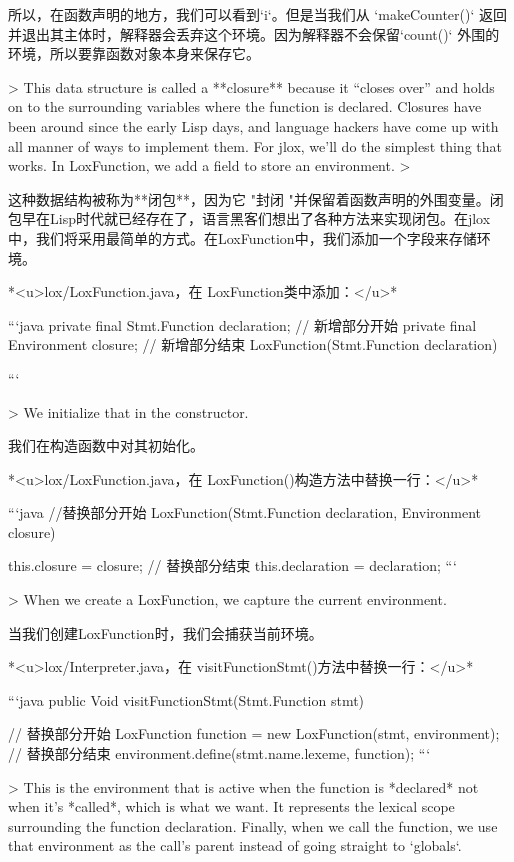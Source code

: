 \documentclass[cn,11pt,chinese]{elegantbook}
\begin{document}
{{{{{{{所以，在函数声明的地方，我们可以看到`i`。但是当我们从 `makeCounter()` 返回并退出其主体时，解释器会丢弃这个环境。因为解释器不会保留`count()` 外围的环境，所以要靠函数对象本身来保存它。

> This data structure is called a **closure** because it “closes over” and holds on to the surrounding variables where the function is declared. Closures have been around since the early Lisp days, and language hackers have come up with all manner of ways to implement them. For jlox, we’ll do the simplest thing that works. In LoxFunction, we add a field to store an environment.
>

这种数据结构被称为**闭包**，因为它 "封闭 "并保留着函数声明的外围变量。闭包早在Lisp时代就已经存在了，语言黑客们想出了各种方法来实现闭包。在jlox中，我们将采用最简单的方式。在LoxFunction中，我们添加一个字段来存储环境。

*<u>lox/LoxFunction.java，在 LoxFunction类中添加：</u>*

```java
  private final Stmt.Function declaration;
  // 新增部分开始
  private final Environment closure;
  // 新增部分结束
  LoxFunction(Stmt.Function declaration) {
```

> We initialize that in the constructor.

我们在构造函数中对其初始化。

*<u>lox/LoxFunction.java，在 LoxFunction()构造方法中替换一行：</u>*

```java
  //替换部分开始
  LoxFunction(Stmt.Function declaration, Environment closure) {
    this.closure = closure;
    // 替换部分结束
    this.declaration = declaration;
```

> When we create a LoxFunction, we capture the current environment.

当我们创建LoxFunction时，我们会捕获当前环境。

*<u>lox/Interpreter.java，在 visitFunctionStmt()方法中替换一行：</u>*

```java
    public Void visitFunctionStmt(Stmt.Function stmt) {
      // 替换部分开始
      LoxFunction function = new LoxFunction(stmt, environment);
      // 替换部分结束
      environment.define(stmt.name.lexeme, function);
```

> This is the environment that is active when the function is *declared* not when it’s *called*, which is what we want. It represents the lexical scope surrounding the function declaration. Finally, when we call the function, we use that environment as the call’s parent instead of going straight to `globals`.

}}}}}}}}}}
\end{document}
